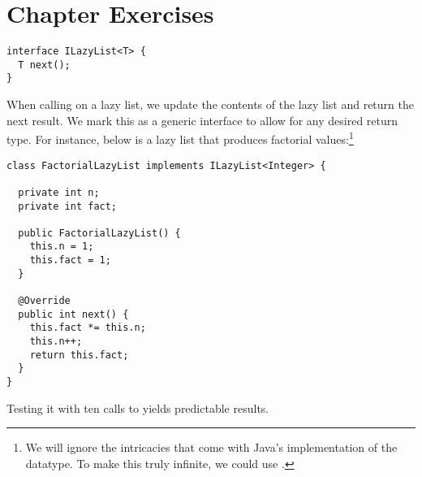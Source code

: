 \section*{Chapter Exercises}


\begin{cl}{}
\begin{lstlisting}[language=MyJava]
interface ILazyList<T> {
  T next();
}
\end{lstlisting}
\end{cl}

When calling  on a lazy list, we update the contents of the lazy list and return the next result. We mark this as a generic interface to allow for any desired return type. For instance, below is a lazy list that produces factorial values:\footnote{We will ignore the intricacies that come with Java's implementation of the  datatype. To make this truly infinite, we could use .}
\begin{cl}{}
\begin{lstlisting}[language=MyJava]
class FactorialLazyList implements ILazyList<Integer> {

  private int n;
  private int fact;
 
  public FactorialLazyList() {
    this.n = 1;
    this.fact = 1;
  }

  @Override
  public int next() {
    this.fact *= this.n;
    this.n++;
    return this.fact;
  }
}
\end{lstlisting}
\end{cl}

Testing it with ten calls to  yields predictable results.

